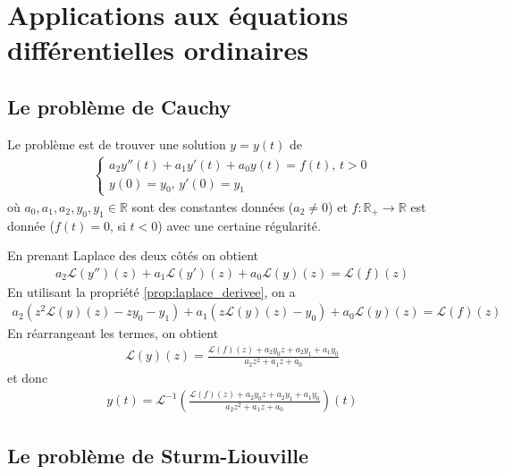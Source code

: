 \chapter[Applications: ODE]{Applications aux équations différentielles ordinaires}
\section{Le problème de Cauchy}
\begin{myExample}
	Le problème est de trouver une solution $y=y(t)$ de 
	\begin{eqnarray}
		\begin{cases}
			a_2y''(t)+a_1y'(t)+a_0y(t)=f(t), \,t>0
			\\
			y(0)=y_0,\,y'(0)=y_1
		\end{cases}
	\end{eqnarray}
	où $a_0,a_1,a_2,y_0,y_1\in\mathbb R$ sont des constantes données ($a_2\neq0$) et $f:\mathbb R_+\rightarrow\mathbb R$ est donnée ($f(t)=0$, si $t<0$) avec une certaine régularité.
	
	En prenant Laplace des deux côtés on obtient
	\begin{eqnarray}
		a_2\mathcal L(y'')(z)+a_1\mathcal L(y')(z)+a_0\mathcal L(y)(z)=\mathcal L(f)(z)
	\end{eqnarray}
	En utilisant la propriété \ref{prop:laplace_derivee}, on a
	\begin{eqnarray}
		a_2(z^2\mathcal L(y)(z)-zy_0-y_1)+a_1(z\mathcal L(y)(z)-y_0)+a_0\mathcal L(y)(z)=\mathcal L(f)(z)
	\end{eqnarray}
	En réarrangeant les termes, on obtient
	\begin{eqnarray}
		\mathcal L(y)(z)=\frac{\mathcal L(f)(z)+ a_2y_0z+a_2y_1+a_1y_0}{a_2z^2+a_1z+a_0}
	\end{eqnarray}
	et donc
	\begin{eqnarray}
		y(t)=\mathcal L^{-1}\left(\frac{\mathcal L(f)(z)+ a_2y_0z+a_2y_1+a_1y_0}{a_2z^2+a_1z+a_0}\right)(t)
	\end{eqnarray}
\end{myExample}

\section{Le problème de Sturm-Liouville}

